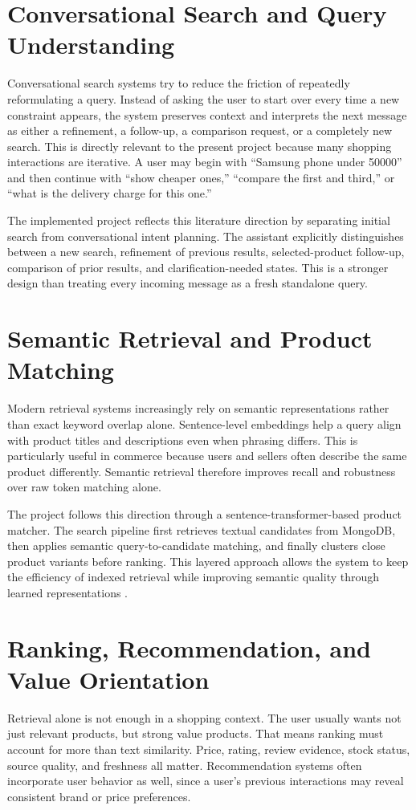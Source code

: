 \documentclass[12pt,a4paper,oneside]{report}
\begin{document}
\section{Conversational Search and Query Understanding}
Conversational search systems try to reduce the friction of repeatedly reformulating a query. Instead of asking the user to start over every time a new constraint appears, the system preserves context and interprets the next message as either a refinement, a follow-up, a comparison request, or a completely new search. This is directly relevant to the present project because many shopping interactions are iterative. A user may begin with “Samsung phone under 50000” and then continue with “show cheaper ones,” “compare the first and third,” or “what is the delivery charge for this one.”

The implemented project reflects this literature direction by separating initial search from conversational intent planning. The assistant explicitly distinguishes between a new search, refinement of previous results, selected-product follow-up, comparison of prior results, and clarification-needed states. This is a stronger design than treating every incoming message as a fresh standalone query.

\section{Semantic Retrieval and Product Matching}
Modern retrieval systems increasingly rely on semantic representations rather than exact keyword overlap alone. Sentence-level embeddings help a query align with product titles and descriptions even when phrasing differs. This is particularly useful in commerce because users and sellers often describe the same product differently. Semantic retrieval therefore improves recall and robustness over raw token matching alone.

The project follows this direction through a sentence-transformer-based product matcher. The search pipeline first retrieves textual candidates from MongoDB, then applies semantic query-to-candidate matching, and finally clusters close product variants before ranking. This layered approach allows the system to keep the efficiency of indexed retrieval while improving semantic quality through learned representations \cite{reimers2019}.

\section{Ranking, Recommendation, and Value Orientation}
Retrieval alone is not enough in a shopping context. The user usually wants not just relevant products, but strong value products. That means ranking must account for more than text similarity. Price, rating, review evidence, stock status, source quality, and freshness all matter. Recommendation systems often incorporate user behavior as well, since a user's previous interactions may reveal consistent brand or price preferences.
\end{document}
